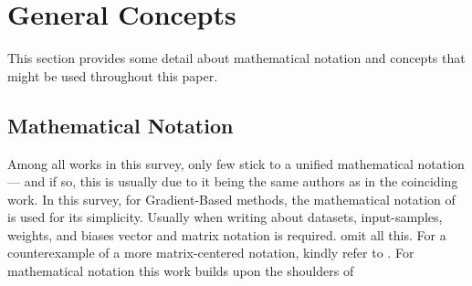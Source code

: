 \section{General Concepts}\label{sect:general-concepts}
This section provides some detail about mathematical notation and concepts that might be used throughout this paper.

\subsection{Mathematical Notation}
Among all works in this survey, only few stick to a unified mathematical notation --- and if so, this is usually due to it being the same authors as in the coinciding work. In this survey, for Gradient-Based methods, the mathematical notation of  is used for its simplicity. Usually when writing about datasets, input-samples, weights, and biases vector and matrix notation is required.  omit all this. For a counterexample of a more matrix-centered notation, kindly refer to .
For mathematical notation this work builds upon the shoulders of~\cite{Kindermans.2018}





